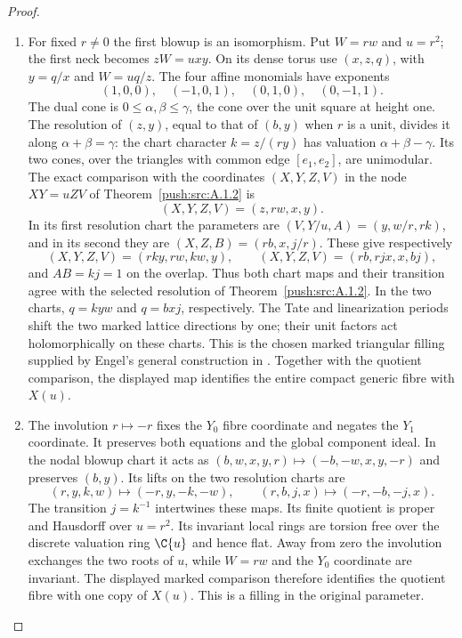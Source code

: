 \begin{proof}
\begin{enumerate}[label=\arabic*.,leftmargin=*]
\item  For fixed $r\ne0$ the first blowup is an isomorphism. Put $W=rw$ and $u=r^2$; the first neck becomes $zW=u xy$. On its dense torus use $(x,z,q)$, with $y=q/x$ and $W=uq/z$. The four affine monomials have exponents
\[
 (1,0,0),\quad(-1,0,1),\quad(0,1,0),\quad(0,-1,1).
\]
The dual cone is $0\le\alpha,\beta\le\gamma$, the cone over the unit square at height one. The resolution of $(z,y)$, equal to that of $(b,y)$ when $r$ is a unit, divides it along $\alpha+\beta=\gamma$: the chart character $k=z/(ry)$ has valuation $\alpha+\beta-\gamma$. Its two cones, over the triangles with common edge $[e_1,e_2]$, are unimodular. The exact comparison with the coordinates $(X,Y,Z,V)$ in the node $XY=uZV$ of Theorem~\ref{push:src:A.1.2} is
\[
 (X,Y,Z,V)=(z,rw,x,y).
\]
In its first resolution chart the parameters are $(V,Y/u,A)=(y,w/r,rk)$, and in its second they are $(X,Z,B)=(rb,x,j/r)$. These give respectively
\[
 (X,Y,Z,V)=(rk y,rw,kw,y),\qquad
 (X,Y,Z,V)=(rb,rjx,x,bj),
\]
and $AB=kj=1$ on the overlap. Thus both chart maps and their transition agree with the selected resolution of Theorem~\ref{push:src:A.1.2}. In the two charts, $q=kyw$ and $q=bxj$, respectively. The Tate and linearization periods shift the two marked lattice directions by one; their unit factors act holomorphically on these charts. This is the chosen marked triangular filling supplied by Engel's general construction in \cite[Proposition~2.8, pp.~6--7]{Engel2026}. Together with the quotient comparison, the displayed map identifies the entire compact generic fibre with $X(u)$.

\item The involution $r\mapsto-r$ fixes the $Y_0$ fibre coordinate and negates the $Y_1$ coordinate. It preserves both equations and the global component ideal. In the nodal blowup chart it acts as $(b,w,x,y,r)\mapsto(-b,-w,x,y,-r)$ and preserves $(b,y)$. Its lifts on the two resolution charts are
\[
 (r,y,k,w)\longmapsto(-r,y,-k,-w),\qquad
 (r,b,j,x)\longmapsto(-r,-b,-j,x).
\]
The transition $j=k^{-1}$ intertwines these maps. Its finite quotient is proper and Hausdorff over $u=r^2$. Its invariant local rings are torsion free over the discrete valuation ring $\C\{u\}$ and hence flat. Away from zero the involution exchanges the two roots of $u$, while $W=rw$ and the $Y_0$ coordinate are invariant. The displayed marked comparison therefore identifies the quotient fibre with one copy of $X(u)$. This is a filling in the original parameter.
\end{enumerate}
\end{proof}
